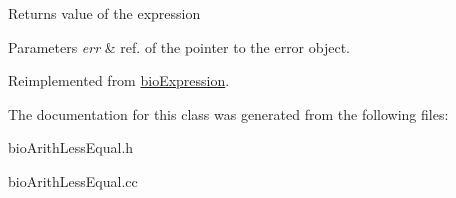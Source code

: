 \begin{DoxyReturn}{Returns}
value of the expression 
\end{DoxyReturn}

\begin{DoxyParams}{Parameters}
{\em err} & ref. of the pointer to the error object. \\
\hline
\end{DoxyParams}


Reimplemented from \hyperlink{classbio_expression_af58662a5d4d456f15bc4f2c9bd4f8a5b}{bio\+Expression}.



The documentation for this class was generated from the following files\+:\begin{DoxyCompactItemize}
\item 
bio\+Arith\+Less\+Equal.\+h\item 
bio\+Arith\+Less\+Equal.\+cc\end{DoxyCompactItemize}
